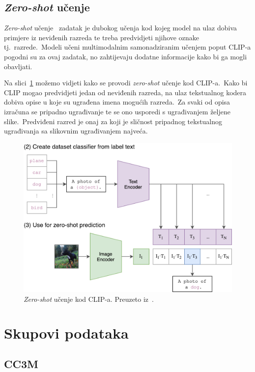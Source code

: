 \documentclass[times, utf8, seminar, numeric]{fer}
\begin{document}
\section{\textit{Zero-shot} učenje}

\textit{Zero-shot} učenje~\cite{xian2018zero} zadatak je dubokog učenja kod kojeg model na ulaz dobiva primjere iz neviđenih razreda te treba predvidjeti njihove oznake tj.\ razrede.\ 
Modeli učeni multimodalnim samonadziranim učenjem poput CLIP-a pogodni su za ovaj zadatak, no zahtijevaju dodatne informacije kako bi ga mogli obavljati.\

Na slici~\ref{fig:CLIP_zero_shot} možemo vidjeti kako se provodi \textit{zero-shot} učenje kod CLIP-a.\ 
Kako bi CLIP mogao predvidjeti jedan od neviđenih razreda, na ulaz tekstualnog kodera dobiva opise u koje su ugrađena imena mogućih razreda.\ 
Za svaki od opisa izračuna se pripadno ugrađivanje te se ono usporedi s ugrađivanjem željene slike.\ Predviđeni razred je onaj za koji je sličnost pripadnog tekstualnog ugrađivanja sa slikovnim ugrađivanjem najveća.\

\begin{figure}[h]
    \centering
    \includegraphics[scale=0.5]{./Slike/CLIP_zero_shot.png}
    \caption{\textit{Zero-shot} učenje kod CLIP-a. Preuzeto iz~\cite{radford2021learning}.}
    \label{fig:CLIP_zero_shot}
\end{figure}

\chapter{Skupovi podataka}

\section{CC3M}
\end{document}
